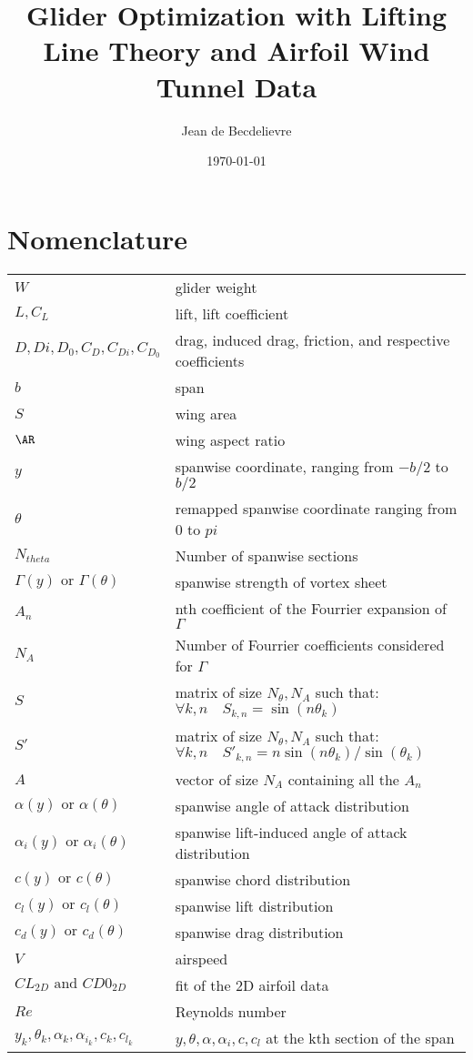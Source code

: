 \documentclass[letterpaper,12pt]{article}
\begin{document}
\title{Glider Optimization with Lifting Line Theory and Airfoil Wind Tunnel Data}
\author{Jean de Becdelievre}
\date{\today}
\maketitle

\section{Nomenclature}

{\renewcommand\arraystretch{1.0}
\noindent\begin{longtable}{@{}l @{\quad : \quad} l@{}}
$W$  & glider weight \\
$L, C_L$ & lift, lift coefficient \\
$D,Di,D_0, C_D,C_{Di},C_{D_0}$& drag, induced drag, friction, and respective coefficients \\
$b$ & span \\
$S$ & wing area \\
$\AR$ & wing aspect ratio \\
$y$ & spanwise coordinate, ranging from $-b/2$ to $b/2$ \\
$\theta$ & remapped spanwise coordinate ranging from $0$ to $pi$ \\
$N_{theta}$ & Number of spanwise sections \\
$\Gamma(y) \text{ or } \Gamma(\theta)$ & spanwise strength of vortex sheet\\
$A_n$ & nth coefficient of the Fourrier expansion of $\Gamma$ \\
$N_{A}$ & Number of Fourrier coefficients considered for $\Gamma$ \\
$S$ & matrix of size $N_{\theta}, N_A$ such that: $ \forall k,n \quad S_{k,n} = \sin(n\theta_k)$ \\
$S'$ & matrix of size $N_{\theta}, N_A$ such that: $ \forall k,n \quad {S'}_{k,n} = n\sin(n\theta_k)/\sin(\theta_k)$ \\
$A$ & vector of size $N_A$ containing all the $A_n$ \\
$\alpha(y) \text{ or } \alpha(\theta)$ & spanwise angle of attack distribution\\
$\alpha_i(y) \text{ or } \alpha_i(\theta)$ & spanwise lift-induced angle of attack distribution\\
$c(y) \text{ or } c(\theta)$ & spanwise chord distribution\\
$c_l(y) \text{ or } c_l(\theta)$ & spanwise lift distribution\\
$c_d(y) \text{ or } c_d(\theta)$ & spanwise drag distribution\\
$V$ & airspeed \\
$CL_{2D} \text{ and } CD0_{2D}$ & fit of the 2D airfoil data \\
$Re$ & Reynolds number \\
$y_k, \theta_k, \alpha_k, \alpha_{i_k}, c_k, c_{l_k}$ &  $y, \theta, \alpha, \alpha_i, c, c_{l}$ at the kth section of the span\\
\end{longtable}}
\end{document}
